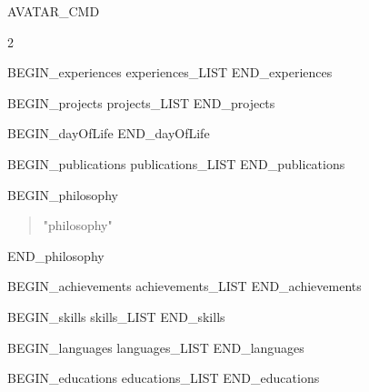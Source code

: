 \documentclass[10pt,a4paper,withhyper]{altacv}
\begin{document}

{{AVATAR_CMD}}


\makecvheader

\begin{paracol}{2}

{{BEGIN_experiences}}
{{experiences_LIST}}
{{END_experiences}}

{{BEGIN_projects}}
{{projects_LIST}}
{{END_projects}}

{{BEGIN_dayOfLife}}
{{END_dayOfLife}}

\newpage

{{BEGIN_publications}}
{{publications_LIST}}
{{END_publications}}

\switchcolumn

{{BEGIN_philosophy}}
\begin{quote}
"{{{philosophy}}}"
\end{quote}
{{END_philosophy}}

{{BEGIN_achievements}}
{{achievements_LIST}}
{{END_achievements}}

{{BEGIN_skills}}
{{skills_LIST}}
{{END_skills}}

{{BEGIN_languages}}
{{languages_LIST}}
{{END_languages}}

{{BEGIN_educations}}
{{educations_LIST}}
{{END_educations}}

\end{paracol}
\end{document}
